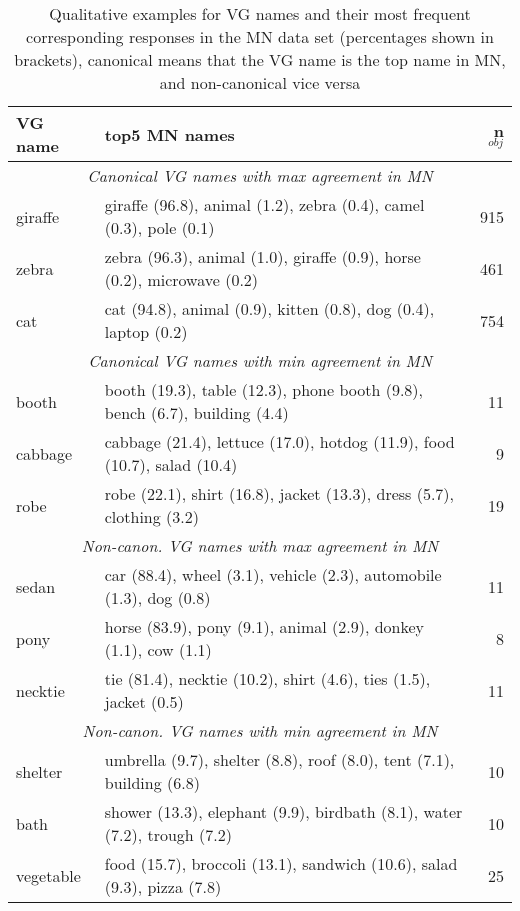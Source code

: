 \begin{table}
\small
\begin{tabular}{lp{4.8cm}r}
\toprule
VG name &  top5 MN names &  n$_{obj}$  \\
\midrule
\multicolumn{3}{c}{\it Canonical VG names with max agreement in MN}\\
 giraffe &  giraffe (96.8), animal (1.2), zebra (0.4), camel (0.3), pole (0.1) &  915 \\
 zebra &  zebra (96.3), animal (1.0), giraffe (0.9), horse (0.2), microwave (0.2) &  461  \\
 cat &  cat (94.8), animal (0.9), kitten (0.8), dog (0.4), laptop (0.2) &  754\\
\midrule
\multicolumn{3}{c}{\it Canonical VG names with min agreement in MN}\\
 booth &  booth (19.3), table (12.3), phone booth (9.8), bench (6.7), building (4.4) &  11 \\
 cabbage &  cabbage (21.4), lettuce (17.0), hotdog (11.9), food (10.7), salad (10.4) &  9 \\
 robe &  robe (22.1), shirt (16.8), jacket (13.3), dress (5.7), clothing (3.2) &  19 \\
  \midrule
  \multicolumn{3}{c}{\it Non-canon. VG names with max agreement in MN}\\
 sedan &  car (88.4), wheel (3.1), vehicle (2.3), automobile (1.3), dog (0.8) &  11 \\
 pony &  horse (83.9), pony (9.1), animal (2.9), donkey (1.1), cow (1.1) &  8 \\
 necktie &  tie (81.4), necktie (10.2), shirt (4.6), ties (1.5), jacket (0.5) &  11 \\
 \midrule
   \multicolumn{3}{c}{\it Non-canon. VG names with min agreement in MN}\\
 shelter &  umbrella (9.7), shelter (8.8), roof (8.0), tent (7.1), building (6.8) &  10 \\
 bath &  shower (13.3), elephant (9.9), birdbath (8.1), water (7.2), trough (7.2) &  10 \\
 vegetable &  food (15.7), broccoli (13.1), sandwich (10.6), salad (9.3), pizza (7.8) &  25 \\
\bottomrule
\end{tabular}
\caption{Qualitative examples for VG names and their most frequent corresponding responses in the MN data set (percentages shown in brackets), canonical means that the VG name is the top name in MN, and non-canonical vice versa}
\end{table}



